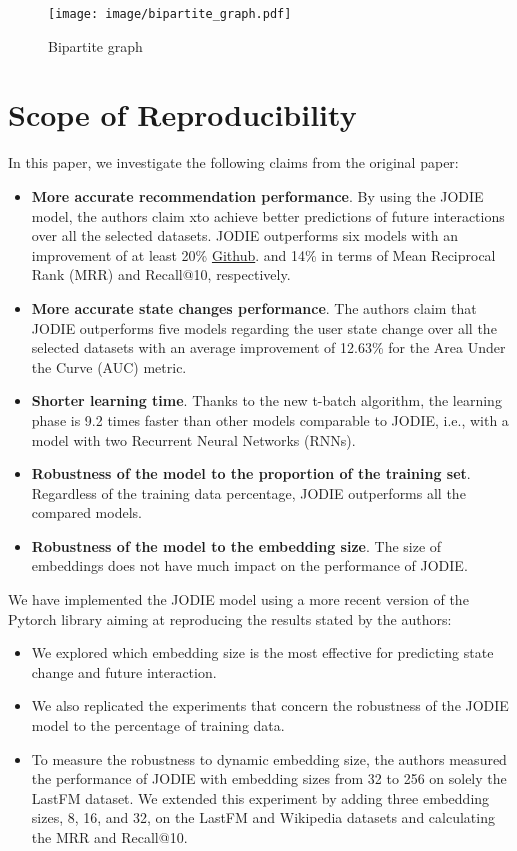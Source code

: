%
%
\begin{figure}[htbp]
    \centering
    \texttt{[image: image/bipartite\_graph.pdf]}
    \caption{Bipartite graph}
    \label{bipartite_graph}
\end{figure}


\section*{Scope of Reproducibility}

In this paper, we investigate the following claims from the original paper:
\begin{itemize}
    \item \textbf{More accurate recommendation performance}. By using the JODIE model, the authors claim xto achieve better predictions of future interactions over all the selected datasets. JODIE outperforms six models with an improvement of at least 20\% \href{https://github.com/ComplexNetTSP/JODIE}{Github}.  and 14\%  in terms of Mean Reciprocal Rank (MRR) and Recall@10, respectively.
    \item \textbf{More accurate state changes performance}. The authors claim that JODIE outperforms five models regarding the user state change over all the selected datasets with an average improvement of 12.63\% for the Area Under the Curve (AUC) metric.
    \item \textbf{Shorter learning time}. Thanks to the new t-batch algorithm, the learning phase is 9.2 times faster than other models comparable to JODIE, i.e., with a model with two Recurrent Neural Networks (RNNs).
    \item \textbf{Robustness of the model to the proportion of the training set}. Regardless of the training data percentage, JODIE outperforms all the compared models.
    \item \textbf{Robustness of the model to the embedding size}. The size of embeddings does not have much impact on the performance of JODIE.
\end{itemize}
We have implemented the JODIE model using a more recent version of the Pytorch library aiming at reproducing the results stated by the authors:
\begin{itemize}
    \item We explored which embedding size is the most effective for predicting state change and future interaction.
    \item We also replicated the experiments that concern the robustness of the JODIE model to the percentage of training data.
    \item To measure the robustness to dynamic embedding size, the authors measured the performance of JODIE with embedding sizes from 32 to 256 on solely the LastFM dataset. We extended this experiment by adding three embedding sizes, 8, 16, and 32, on the LastFM and Wikipedia datasets and calculating the MRR and Recall@10.
\end{itemize}
